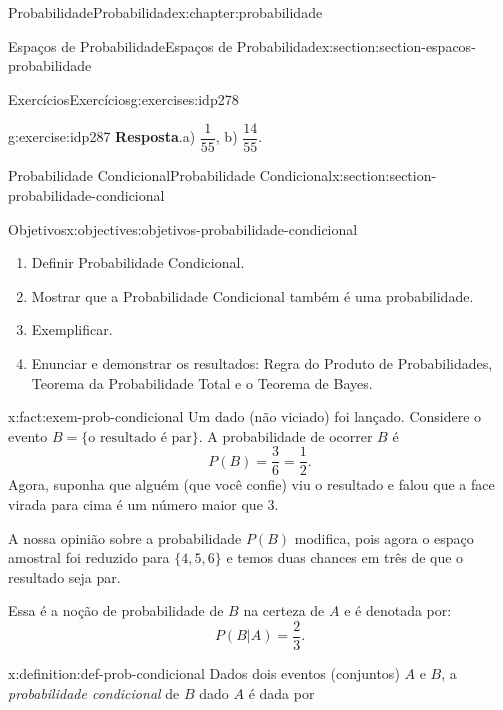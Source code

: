 \documentclass[oneside,10pt,]{book}
\newcommand{\blocktitlefont}{\relax}
\numberwithin{equation}{section}
\begin{document}
\begin{chapterptx}{Probabilidade}{}{Probabilidade}{}{}{x:chapter:probabilidade}
\begin{sectionptx}{Espaços de Probabilidade}{}{Espaços de Probabilidade}{}{}{x:section:section-espacos-probabilidade}
\begin{exercises-subsection}{Exercícios}{}{Exercícios}{}{}{g:exercises:idp278}
\begin{divisionexercise}{5}{}{}{g:exercise:idp287}
\noindent\textbf{\blocktitlefont Resposta}.\hypertarget{g:answer:idp288}{}\quad{}a) \(\dfrac{1}{55}\), b) \(\dfrac{14}{55}\).%
\end{divisionexercise}%
\end{exercises-subsection}
\end{sectionptx}
%
%
\typeout{************************************************}
\typeout{************************************************}
%
\begin{sectionptx}{Probabilidade Condicional}{}{Probabilidade Condicional}{}{}{x:section:section-probabilidade-condicional}
\begin{objectives}{Objetivos}{x:objectives:objetivos-probabilidade-condicional}
%
\begin{enumerate}
\item{}Definir Probabilidade Condicional.%
\item{}Mostrar que a Probabilidade Condicional também é uma probabilidade.%
\item{}Exemplificar.%
\item{}Enunciar e demonstrar os resultados: Regra do Produto de Probabilidades, Teorema da Probabilidade Total e o Teorema de Bayes.%
\end{enumerate}
\end{objectives}
\begin{fact}{}{}{x:fact:exem-prob-condicional}%
Um dado (não viciado) foi lançado. Considere o evento \(B = \{\text{o resultado é par}\}\). A probabilidade de ocorrer \(B\) é%
\begin{equation*}
P(B) = \frac{3}{6} = \frac{1}{2}. 
\end{equation*}
Agora, suponha que alguém (que você confie) viu o resultado e falou que a face virada para cima é um número maior que 3.%
\par
A nossa opinião sobre a probabilidade \(P(B)\) modifica, pois agora o espaço amostral foi reduzido para \(\{4, 5, 6\}\) e temos duas chances em três de que o resultado seja par.%
\par
Essa é a noção de probabilidade de \(B\) na certeza de \(A\) e é denotada por:%
\begin{equation*}
P(B|A) = \frac{2}{3}.
\end{equation*}
%
\end{fact}
\begin{definition}{}{x:definition:def-prob-condicional}%
Dados dois eventos (conjuntos) \(A\) e \(B\), a \emph{probabilidade condicional} de \(B\) dado \(A\) é dada por%

\end{definition}
\end{sectionptx}
\end{chapterptx}
\end{document}
